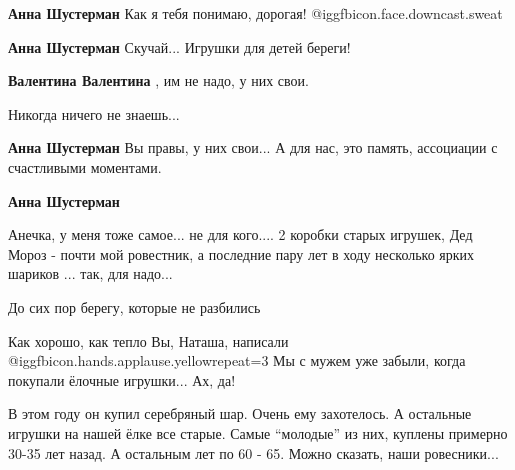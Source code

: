 \begin{itemize}
\begin{itemize} %
\textbf{Анна Шустерман} Как я тебя понимаю, дорогая! @igg{fbicon.face.downcast.sweat} 

\textbf{Анна Шустерман} Скучай... Игрушки для детей береги!

\begin{itemize} %
\textbf{Валентина Валентина} , им не надо, у них свои.

Никогда ничего не знаешь...

\textbf{Анна Шустерман}
Вы правы, у них свои... А для нас, это память, ассоциации с счастливыми моментами.
\end{itemize} %

\textbf{Анна Шустерман} 

Анечка, у меня тоже самое... не для кого.... 2 коробки старых игрушек, Дед
Мороз - почти мой ровестник, а последние пару лет в ходу несколько ярких
шариков ... так, для надо...

\end{itemize} %

До сих пор берегу, которые не разбились


Как хорошо, как тепло Вы, Наташа, написали @igg{fbicon.hands.applause.yellow}{repeat=3} 
Мы с мужем уже забыли, когда покупали ёлочные игрушки... Ах, да!

В этом году он купил серебряный шар. Очень ему захотелось. А остальные игрушки
на нашей ёлке все старые. Самые \enquote{молодые} из них, куплены примерно 30-35 лет
назад. А остальным лет по 60 - 65. Можно сказать, наши ровесники...


\end{itemize} %
